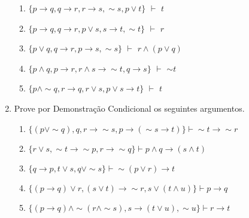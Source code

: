 \documentclass[12pt, a4paper,final]{article}
\begin{document}
\begin{enumerate}
\begin{enumerate}
            \item $\{ p \rightarrow q,    q \rightarrow r,    r \rightarrow s,    \sim s,    p \vee t \}$ {\bf $\vdash $} $t$  %
            
            \item $\{ p \rightarrow q,    q \rightarrow r,    p \vee s,    s \rightarrow t,    \sim t \}$ {\bf $\vdash $} $r$  %
            
            \item $\{ p \vee q,    q \rightarrow r,    p \rightarrow s,     \sim s  \}$ {\bf $\vdash $} $r \wedge (p \vee q)$  %

            \item $\{ p \wedge q, p \rightarrow r,  r \wedge s \rightarrow \sim t,  q \rightarrow s   \}$ {\bf $\vdash $} $\sim t$  %
            
            \item $\{ p \wedge \sim q, r \rightarrow q,  r \vee s,  p \vee s \rightarrow t   \}$ {\bf $\vdash $} $ t $  %
            
        \end{enumerate}
        
        \item Prove por Demonstração Condicional os seguintes argumentos.
        
        \begin{enumerate}

            \item $\{(p \vee \sim q), q,   r \rightarrow  \sim s, p \rightarrow (\sim s \rightarrow t) \} \vdash \sim t \rightarrow \sim r $  %
            
            \item $\{r \vee s,  \sim t \rightarrow  \sim p,  r \rightarrow \sim q \} \vdash p \wedge q \rightarrow (s \wedge t) $ %
            
            \item $\{ q \rightarrow p,   t \vee s,   q \vee\sim s \} \vdash \sim (p \vee r) \rightarrow t$ %

            \item $\{(p \rightarrow q) \vee r,  (s \vee t) \rightarrow  \sim r,    s \vee (t \wedge u) \} \vdash p \rightarrow q $ %
            
            \item $\{(p \rightarrow q) \wedge \sim(r \wedge \sim s),  s \rightarrow   (t \vee u),  \sim u \} \vdash r \rightarrow t $ %
            

\end{enumerate}
\end{enumerate}
\end{document}
